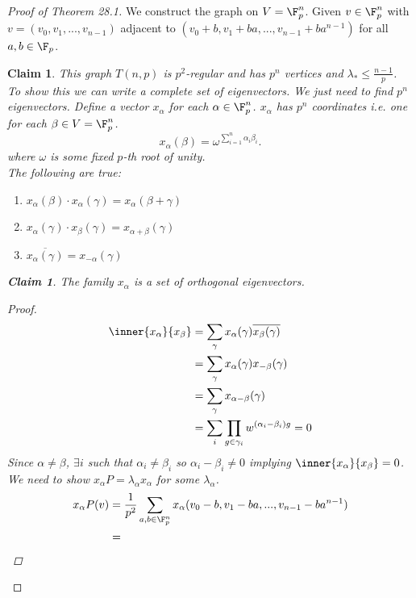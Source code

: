 \documentclass[a4paper]{article}
\newtheorem{claim}[thm]{Claim}
\begin{document}
\begin{proof}[Proof of Theorem 28.1]
    We construct the graph on $V=\F_p^n$. Given $v\in \F_p^n$ with $v=(v_0,v_1,...,v_{n-1})$ adjacent to $(v_0+b,v_1+ba,...,v_{n-1}+ba^{n-1})$ for all $a,b\in \F_p$. 
    \begin{claim}
        This graph $T(n,p)$ is $p^2$-regular and has $p^n$ vertices and $\lambda_*\leq \frac{n-1}{p}$.\\
        To show this we can write a complete set of eigenvectors. We just need to find $p^n$ eigenvectors. Define a vector $x_\alpha$ for each $\alpha\in \F_p^n$. $x_\alpha$ has $p^n$ coordinates i.e. one for each $\beta\in V=\F_p^n$. 
        \[
        x_\alpha(\beta)=\omega^{\sum_{i=1}^n \alpha_i\beta_i}
        .\] 
        where $\omega$ is some fixed $p$-th root of unity. \\
        The following are true:
        \begin{enumerate}
            \item $x_\alpha(\beta)\cdot x_\alpha(\gamma)=x_\alpha(\beta+\gamma)$
            \item $x_\alpha(\gamma)\cdot x_\beta(\gamma)=x_{\alpha+\beta}(\gamma)$
            \item $\overline{x_\alpha(\gamma)}=x_{-\alpha}(\gamma)$
        \end{enumerate}
        \begin{claim}
            The family $x_\alpha$ is a set of orthogonal eigenvectors. 
            \begin{proof}
                \begin{align*}
                    \inner{x_\alpha}{x_\beta}&=\sum_\gamma x_\alpha(\gamma)\overline{x_\beta(\gamma)}\\
                    &=\sum_{\gamma}x_\alpha(\gamma)x_{-\beta}(\gamma)\\
                    &=\sum_{\gamma}x_{\alpha-\beta}(\gamma)\\
                    &=\sum_i \prod_{g\in \gamma_i}w^{(\alpha_i-\beta_i)g}=0
                \end{align*}
                Since $\alpha\neq \beta$, $\exists i$ such that $\alpha_i\neq \beta_i$ so $\alpha_i-\beta_i\neq 0$ implying $ \inner{x_\alpha}{x_\beta}=0$. \\
                We need to show $x_\alpha P=\lambda_\alpha x_\alpha$ for some $\lambda_\alpha$.
                \begin{align*}
                    x_\alpha P(v)&=\frac{1}{p^2}\sum_{a,b\in \F_p^n}x_\alpha(v_0-b,v_1-ba,...,v_{n-1}-ba^{n-1})\\
                    &=
                \end{align*}
            \end{proof}
        \end{claim}
    \end{claim}
\end{proof}
\end{document}
